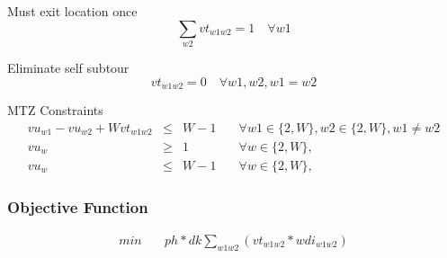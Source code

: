 Must exit location once
\vspace{-5pt}
\begin{equation}
    \sum_{w2} vt_{w1w2} = 1 \quad \forall w1
\end{equation}

Eliminate self subtour
\vspace{-5pt}
\begin{equation}
    vt_{w1w2} = 0 \quad \forall w1, w2, w1=w2
\end{equation}

MTZ Constraints
\vspace{-5pt}
\begin{equation}
\begin{aligned}
    vu_{w1} - vu_{w2} + W vt_{w1w2} & \le &  W-1 & \quad \forall w1 \in \{2,W\}, w2 \in \{2,W\}, w1 \ne w2 \\ 
	vu_{w} & \ge & 1 & \quad \forall w \in \{2,W\},  \\
	vu_{w} & \le & W-1 & \quad \forall w \in \{2,W\},  
\end{aligned}
\end{equation}


\subsubsection{Objective Function}
\vspace{-15pt}
\begin{equation}
\begin{aligned}
	min 	\quad &	ph * dk \sum_{w1w2}  (vt_{w1w2} * wdi_{w1w2} )
\end{aligned}
\end{equation}
